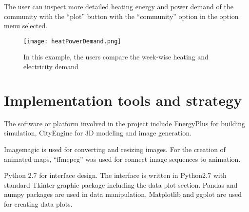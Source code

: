 The user can inspect more detailed heating energy and power demand of
the community with the ``plot'' button with the ``community'' option
in the option menu selected.
\begin{figure}[h!]
  \centering
  \texttt{[image: heatPowerDemand.png]}
  \caption[Comparing Community Heating and Electricity Demand]{In this
    example, the users compare the week-wise heating and electricity
    demand}
  \label{fig:heatPowerDemand}
\end{figure}

\section {Implementation tools and strategy}
The software or platform involved in the project include EnergyPlus
for building simulation, CityEngine for 3D modeling and image
generation. 

Imagemagic is used for converting and resizing images. For the
creation of animated maps, ``ffmepeg'' was used for connect image
sequences to animation.

Python 2.7 for interface design. The interface is written
in Python2.7 with standard Tkinter graphic package including the data
plot section. Pandas and numpy packages are used in data
manipulation. Matplotlib and ggplot are used for creating data plots.

\begin{comment}
\section{Future Trends}
Harrower and Fabrikant mentioned that the chanllenge of using animated
maps is the overflow of information and the vulnerability to
distraction~\cite{Harrower2008}. One example mentioned by Harrower and
Fabrikant is the comparison of color on the map and that on the legend
becomes difficult for animated maps as a result of the changing of
images. They proposed the audio legend approach of strengthening
information convey with minimized
distraction~\cite{Harrower2008}. This might become one of the next
extensions of the current Dynamic Energy Map interface design.

They also suggested that the difference in time should have different
visual representations in data display~\cite{Harrower2008}. Peuquet
claimed that ``The development of temporal analytical capabilities in
GIS such as temporal queries requires basic topological structures in
both time and space''~\cite{Peuquet1994}. Thus the different spatial
representation seems to be a natural choice for adapting to different
temporal resolution and scale.



The non-interactive animation could be found
\href{http://www.armechxyj.com/energy-mapping.html#redblueAnime3d}{through
  this link}.
\end{comment}